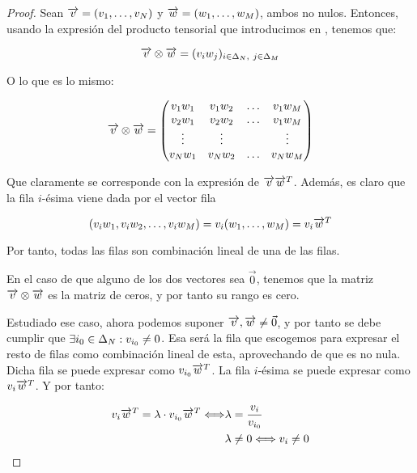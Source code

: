 \begin{proof}

Sean $\overrightarrow{v} = (v_1, \ldots, v_N)$ y $\overrightarrow{w} = (w_1, \ldots, w_M)$, ambos no nulos. Entonces, usando la expresión del producto tensorial que introducimos en , tenemos que:

\begin{equation}
    \overrightarrow{v} \otimes \overrightarrow{w} = (v_i w_j)_{i \in \Delta_{N},\ j \in \Delta_{M}}
\end{equation}

O lo que es lo mismo:

\begin{equation}
    \overrightarrow{v} \otimes \overrightarrow{w} = \begin{pmatrix}
        v_1 w_1 & v_1 w_2 & \ldots & v_1 w_M \\
        v_2 w_1 & v_2 w_2 & \ldots & v_1 w_M \\
        \vdots  & \vdots & & \vdots \\
        v_N w_1 & v_N w_2 & \ldots & v_N w_M \\
    \end{pmatrix}
\end{equation}

Que claramente se corresponde con la expresión de $\overrightarrow{v} \overrightarrow{w}^T$. Además, es claro que la fila $i$-ésima viene dada por el vector fila

$$(v_i w_1, v_i w_2, \ldots, v_i w_M) = v_i (w_1, \ldots, w_M) = v_i \overrightarrow{w}^T$$

Por tanto, todas las filas son combinación lineal de una de las filas.

En el caso de que alguno de los dos vectores sea $\vec{0}$, tenemos que la matriz $\overrightarrow{v} \otimes \overrightarrow{w}$ es la matriz de ceros, y por tanto su rango es cero.

Estudiado ese caso, ahora podemos suponer $\overrightarrow{v}, \overrightarrow{w} \neq \vec{0}$, y por tanto se debe cumplir que $\exists i_0 \in \Delta_{N}: v_{i_0} \neq 0$. Esa será la fila que escogemos para expresar el resto de filas como combinación lineal de esta, aprovechando de que es no nula. Dicha fila se puede expresar como $v_{i_0} \overrightarrow{w}^T$. La fila $i$-ésima se puede expresar como $v_i \overrightarrow{w}^T$. Y por tanto:

\begin{equation}
\begin{split}
    v_i \overrightarrow{w}^T = \lambda \cdot v_{i_0} \overrightarrow{w}^T \Longleftrightarrow & \lambda = \frac{v_i}{v_{i_0}} \\
                                                               & \lambda \neq 0 \Longleftrightarrow v_i \neq 0
\end{split}
\end{equation}


\end{proof}
